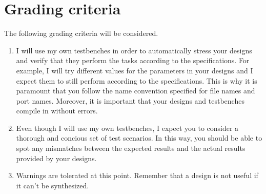 \documentclass[number=03]{assignment}
\begin{document}
\section{Grading criteria}\label{sec:Grading}
The following grading criteria will be considered.

\begin{enumerate}
\item {}
I will use my own testbenches in order to automatically stress your designs and verify that they perform the tasks according to the specifications. 
For example, I will try different values for the parameters in your designs and I expect them to still perform according to the specifications.
This is why it is paramount that you follow the name convention specified for file names and port names.
Moreover, it is important that your designs and testbenches compile in \ModelSim without errors.
\item {}
Even though I will use my own testbenches, I expect you to consider a thorough and concious set of test scenarios.
In this way, you should be able to spot any mismatches between the expected results and the actual results provided by your designs.
\item {}
Warnings are tolerated at this point.
Remember that a design is not useful if it can't be synthesized.
\end{enumerate}


\end{document}

